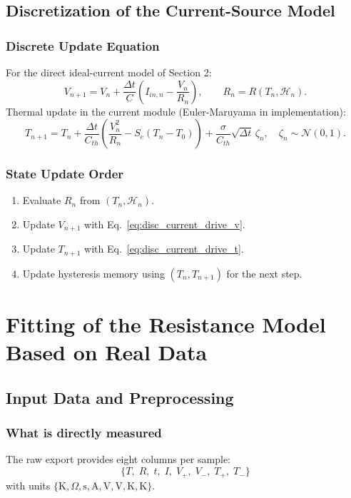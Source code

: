 \documentclass[11pt]{article}
\begin{document}
\subsection{Discretization of the Current-Source Model}
\subsubsection*{Discrete Update Equation}
For the direct ideal-current model of Section 2:
\begin{equation}
V_{n+1}
=
V_n+\frac{\Delta t}{C}\left(I_{in,n}-\frac{V_n}{R_n}\right),
\qquad
R_n=R(T_n,\mathcal{H}_n).
\label{eq:disc_current_drive_v}
\end{equation}
Thermal update in the current module (Euler-Maruyama in implementation):
\begin{equation}
T_{n+1}
=
T_n
+\frac{\Delta t}{C_{th}}
\left(
\frac{V_n^2}{R_n}
-S_e(T_n-T_0)
\right)
+\frac{\sigma}{C_{th}}\sqrt{\Delta t}\,\zeta_n,
\quad
\zeta_n\sim\mathcal{N}(0,1).
\label{eq:disc_current_drive_t}
\end{equation}

\subsubsection*{State Update Order}
\begin{enumerate}
    \item Evaluate \(R_n\) from \((T_n,\mathcal{H}_n)\).
    \item Update \(V_{n+1}\) with Eq.~\eqref{eq:disc_current_drive_v}.
    \item Update \(T_{n+1}\) with Eq.~\eqref{eq:disc_current_drive_t}.
    \item Update hysteresis memory using \((T_n,T_{n+1})\) for the next step.
\end{enumerate}

\section{Fitting of the Resistance Model Based on Real Data}

\subsection{Input Data and Preprocessing}
\subsubsection*{What is directly measured}
The raw export provides eight columns per sample:
\[
\{T,\;R,\;t,\;I,\;V_+,\;V_-,\;T_+,\;T_-\}
\]
with units \(\{\mathrm{K},\Omega,\mathrm{s},\mathrm{A},\mathrm{V},\mathrm{V},\mathrm{K},\mathrm{K}\}\).
\end{document}

